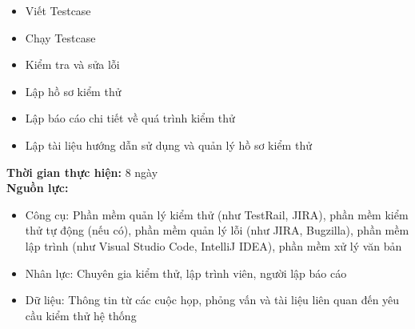 {\begin{minipage}{\textwidth}
\begin{itemize}
\begin{itemize}
            \item Viết Testcase
            \item Chạy Testcase
            \item Kiểm tra và sửa lỗi
            \item Lập hồ sơ kiểm thử
            \item Lập báo cáo chi tiết về quá trình kiểm thử
            \item Lập tài liệu hướng dẫn sử dụng và quản lý hồ sơ kiểm thử
        \end{itemize}
    \end{itemize}
    \noindent \textbf{Thời gian thực hiện:} 8 ngày \\
    \noindent \textbf{Nguồn lực:}
    \begin{itemize}
        \item Công cụ: Phần mềm quản lý kiểm thử (như TestRail, JIRA), phần mềm kiểm thử tự động (nếu có), phần mềm quản lý lỗi (như JIRA, Bugzilla), phần mềm lập trình (như Visual Studio Code, IntelliJ IDEA), phần mềm xử lý văn bản
        \item Nhân lực: Chuyên gia kiểm thử, lập trình viên, người lập báo cáo
        \item Dữ liệu: Thông tin từ các cuộc họp, phỏng vấn và tài liệu liên quan đến yêu cầu kiểm thử hệ thống
    \end{itemize}
    \end{minipage}
}
\newpage
